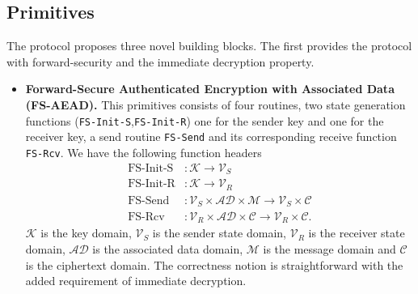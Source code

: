 \documentclass[11pt,a4paper,twoside,openright,bibliography=totoc]{scrbook}
\renewcommand{\t}{\text} %
\begin{document}
\subsection{Primitives}
\label{sec:primitives-4}

The protocol proposes three novel building blocks. The first provides
the protocol with forward-security and the immediate decryption
property.
\begin{itemize}
\item \textbf{Forward-Secure Authenticated Encryption with Associated Data (FS-AEAD).}
  This primitives consists of four routines, two state generation functions
  (\texttt{FS-Init-S},\texttt{FS-Init-R})
  one for the sender key and one for the receiver key, a send routine \texttt{FS-Send}
  and its corresponding receive function \texttt{FS-Rcv}. We have the following
  function headers
  \begin{align*}
    \t{FS-Init-S} & : \mathcal{K} \rightarrow \mathcal{V}_S \\
    \t{FS-Init-R} & : \mathcal{K} \rightarrow \mathcal{V}_R \\
    \t{FS-Send} & : \mathcal{V}_S \times \mathcal{AD} \times \mathcal{M}
                                \rightarrow \mathcal{V}_S \times \mathcal{C} \\
    \t{FS-Rcv} & : \mathcal{V}_R \times \mathcal{AD} \times \mathcal{C}
                                \rightarrow \mathcal{V}_R \times \mathcal{C}.
  \end{align*}
  $\mathcal{K}$ is the key domain, $\mathcal{V}_S$ is the sender state domain,
  $\mathcal{V}_R$ is the receiver state domain, $\mathcal{AD}$
  is the associated data domain, $\mathcal{M}$ is the message domain and
  $\mathcal{C}$ is the ciphertext domain. The correctness notion is
  straightforward with the added requirement of immediate decryption.
\end{itemize}
\end{document}
